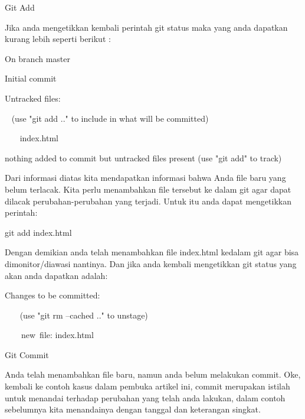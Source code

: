  \hspace*{0.5in} Git Add \par
\noindent 
Jika anda mengetikkan kembali perintah git status maka yang anda dapatkan kurang lebih seperti berikut : \par
\noindent 
On branch master~~~  \par
\noindent 
Initial commit \par
\noindent 
Untracked files: \par
\noindent 
~  \hspace*{0.5in} (use "git add .." to include in what will be committed) \par
\noindent 
~~~  \hspace*{0.5in} index.html \par
\noindent 
 \hspace*{0.5in} nothing added to commit but untracked files present (use "git add" to track) \par
\vspace{12pt}
\noindent 
Dari informasi diatas kita mendapatkan informasi bahwa Anda file baru yang belum terlacak. Kita perlu menambahkan file tersebut ke dalam git agar dapat dilacak perubahan-perubahan yang terjadi. Untuk itu anda dapat mengetikkan perintah: \par
\noindent 
 \hspace*{0.5in} git add index.html \par
\noindent 
Dengan demikian anda telah menambahkan file index.html kedalam git agar bisa dimonitor/diawasi nantinya. Dan jika anda kembali mengetikkan git status yang akan anda dapatkan adalah: \par
\noindent 
 \hspace*{0.5in} Changes to be committed: \par
\noindent 
 \hspace*{0.5in} ~~~ (use "git rm --cached .." to unstage) \par
\noindent 
 \hspace*{0.5in} ~~~~new~file:   index.html \par
\noindent 
 \hspace*{0.5in} Git Commit \par
\noindent 
Anda telah menambahkan file baru, namun anda belum melakukan commit. Oke, kembali ke contoh kasus dalam pembuka artikel ini, commit merupakan istilah untuk menandai terhadap perubahan yang telah anda lakukan, dalam contoh sebelumnya kita menandainya dengan tanggal dan keterangan singkat.  \par
